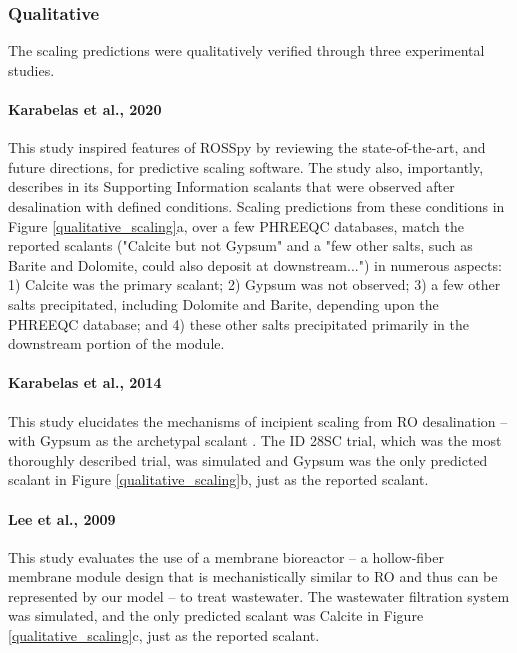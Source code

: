 \subsubsection{Qualitative}
The scaling predictions were qualitatively verified through three experimental studies. 

\paragraph{Karabelas et al., 2020 \cite{Karabelas2020ScalingTools}}
This study inspired features of ROSSpy by reviewing the state-of-the-art, and future directions, for predictive scaling software. The study also, importantly, describes in its Supporting Information scalants that were observed after desalination with defined conditions. Scaling predictions from these conditions in Figure \ref{qualitative_scaling}a, over a few PHREEQC databases, match the reported scalants ("Calcite but not Gypsum" and a "few other salts, such as Barite and Dolomite, could also deposit at downstream...") in numerous aspects: 1) Calcite was the primary scalant; 2) Gypsum was not observed; 3) a few other salts precipitated, including Dolomite and Barite, depending upon the PHREEQC database; and 4) these other salts precipitated primarily in the downstream portion of the module.  

\paragraph{Karabelas et al., 2014 \cite{Karabelas2014IncipientChannels}}
This study elucidates the mechanisms of incipient scaling from RO desalination -- with Gypsum as the archetypal scalant \cite{Lyster2009CoupledModule}. The ID 28SC trial, which was the most thoroughly described trial, was simulated and Gypsum was the only predicted scalant in Figure \ref{qualitative_scaling}b, just as the reported scalant.  

\paragraph{Lee et al., 2009 \cite{Lee2009MembraneWastewater}}
This study evaluates the use of a membrane bioreactor -- a hollow-fiber membrane module design that is mechanistically similar to RO and thus can be represented by our model -- to treat wastewater. The wastewater filtration system was simulated, and the only predicted scalant was Calcite in Figure \ref{qualitative_scaling}c, just as the reported scalant.

